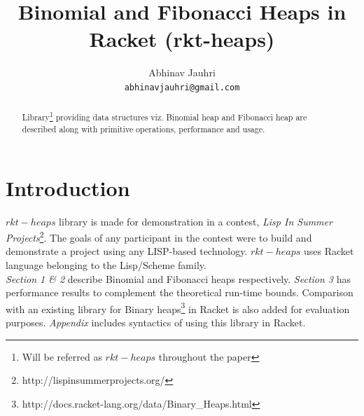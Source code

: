 \documentclass{llncs}
\title{Binomial and Fibonacci Heaps in Racket (rkt-heaps)}
\begin{document}
\author{
	Abhinav Jauhri\\
	\texttt{abhinavjauhri@gmail.com}\\
}


%




\maketitle

\begin{abstract}
	Library\footnote{Will be referred as $rkt-heaps$ throughout the paper} providing data structures viz. Binomial heap \cite{vuillemin1978data} and Fibonacci heap\cite{fredman1987fibonacci} are described along with primitive operations, performance and usage. 
\end{abstract}

\section{Introduction}
$rkt-heaps$ library is made for demonstration in a contest, \textit{Lisp In Summer Projects}\footnote{http://lispinsummerprojects.org/}. The goals of any participant in the contest were to build and demonstrate a project using any LISP-based technology. $rkt-heaps$ uses Racket language belonging to the Lisp/Scheme family. \\

\emph{Section 1 \& 2} describe Binomial and Fibonacci heaps respectively. \emph{Section 3} has performance results to complement the theoretical run-time bounds. Comparison with an existing library for Binary heaps\footnote{http://docs.racket-lang.org/data/Binary\_Heaps.html} in Racket is also added for evaluation purposes. \emph{Appendix} includes syntactics of using this library in Racket.
\end{document}
